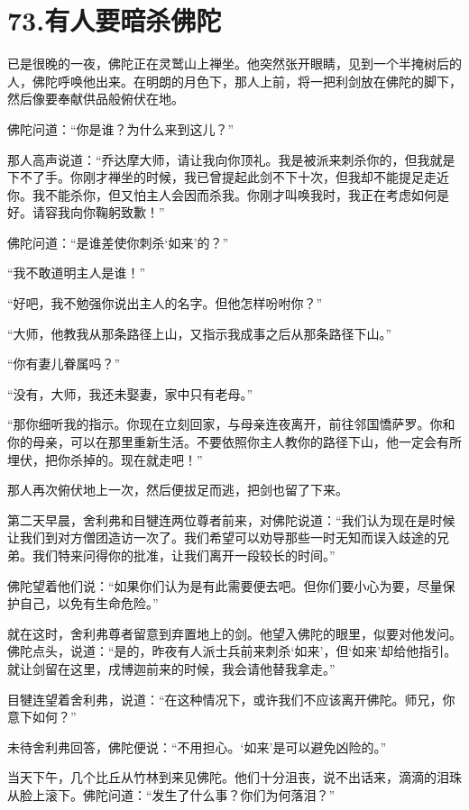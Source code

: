 \documentclass[12pt,twoside,openany]{book}
\begin{document}

\chapter{73.有人要暗杀佛陀}\label{ch73}

已是很晚的一夜，佛陀正在灵鹫山上禅坐。他突然张开眼睛，见到一个半掩树后的人，佛陀呼唤他出来。在明朗的月色下，那人上前，将一把利剑放在佛陀的脚下，然后像要奉献供品般俯伏在地。

佛陀问道：“你是谁？为什么来到这儿？”

那人高声说道：“乔达摩大师，请让我向你顶礼。我是被派来刺杀你的，但我就是下不了手。你刚才禅坐的时候，我已曾提起此剑不下十次，但我却不能提足走近你。我不能杀你，但又怕主人会因而杀我。你刚才叫唤我时，我正在考虑如何是好。请容我向你鞠躬致歉！”

佛陀问道：“是谁差使你刺杀‘如来’的？”

“我不敢道明主人是谁！”

“好吧，我不勉强你说出主人的名字。但他怎样吩咐你？”

“大师，他教我从那条路径上山，又指示我成事之后从那条路径下山。”

“你有妻儿眷属吗？”

“没有，大师，我还未娶妻，家中只有老母。”

“那你细听我的指示。你现在立刻回家，与母亲连夜离开，前往邻国憍萨罗。你和你的母亲，可以在那里重新生活。不要依照你主人教你的路径下山，他一定会有所埋伏，把你杀掉的。现在就走吧！”

那人再次俯伏地上一次，然后便拔足而逃，把剑也留了下来。

第二天早晨，舍利弗和目犍连两位尊者前来，对佛陀说道：“我们认为现在是时候让我们到对方僧团造访一次了。我们希望可以劝导那些一时无知而误入歧途的兄弟。我们特来问得你的批准，让我们离开一段较长的时间。”

佛陀望着他们说：“如果你们认为是有此需要便去吧。但你们要小心为要，尽量保护自己，以免有生命危险。”

就在这时，舍利弗尊者留意到弃置地上的剑。他望入佛陀的眼里，似要对他发问。佛陀点头，说道：“是的，昨夜有人派士兵前来刺杀‘如来’，但‘如来’却给他指引。就让剑留在这里，戌博迦前来的时候，我会请他替我拿走。”

目犍连望着舍利弗，说道：“在这种情况下，或许我们不应该离开佛陀。师兄，你意下如何？”

未待舍利弗回答，佛陀便说：“不用担心。‘如来’是可以避免凶险的。”

当天下午，几个比丘从竹林到来见佛陀。他们十分沮丧，说不出话来，滴滴的泪珠从脸上滚下。佛陀问道：“发生了什么事？你们为何落泪？”
\end{document}
